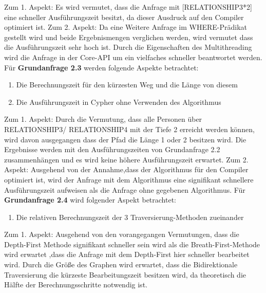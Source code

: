 Zum 1. Aspekt: Es wird vermutet, dass die Anfrage mit [RELATIONSHIP3*2] eine schneller Ausführungszeit besitzt, da dieser Ausdruck auf den Compiler optimiert ist. \newline
Zum 2. Aspekt: Da eine Weitere Anfrage im WHERE-Prädikat gestellt wird und beide Ergebnismengen verglichen werden, wird vermutet dass die Ausführungszeit sehr hoch ist. Durch die Eigenschaften des Multithreading wird die Anfrage in der Core-API um ein vielfaches schneller beantwortet werden. \newline  \newline
Für \textbf{Grundanfrage 2.3} werden folgende Aspekte betrachtet: 
\begin{enumerate}
	\item Die Berechnungszeit für den kürzesten Weg und die Länge von diesem
	\item Die Ausführungszeit in Cypher ohne Verwenden des Algorithmus
\end{enumerate}
Zum 1. Aspekt: Durch die Vermutung, dass alle Personen über RELATIONSHIP3/ RELATIONSHIP4 mit der Tiefe 2 erreicht werden können, wird davon ausgegangen dass der Pfad die Länge 1 oder 2 besitzen  wird. Die Ergebnisse werden mit den Ausführungszeiten von Grundanfrage 2.2 zusammenhängen und es wird keine höhere Ausführungszeit erwartet. \newline
Zum 2. Aspekt: Ausgehend von der Annahme,dass der Algorithmus für den Compiler optimiert ist, wird der Anfrage mit dem Algorithmus eine signifikant schnellere Ausführungszeit aufweisen als die Anfrage ohne gegebenen Algorithmus. \newline \newline
Für \textbf{Grundanfrage 2.4} wird folgender Aspekt betrachtet:
\begin{enumerate}
	\item Die relativen Berechnungszeit der 3 Traversierung-Methoden zueinander
\end{enumerate}
Zum 1. Aspekt: Ausgehend von den vorangegangen Vermutungen, dass die Depth-First Methode signifikant schneller sein wird  als die Breath-First-Methode wird erwartet ,dass die Anfrage mit dem Depth-First hier schneller bearbeitet wird. Durch die Größe des Graphen wird erwartet, dass die Bidirektionale Traversierung die kürzeste Bearbeitungszeit besitzen wird, da theoretisch die Hälfte der Berechnungsschritte notwendig ist. \newline
